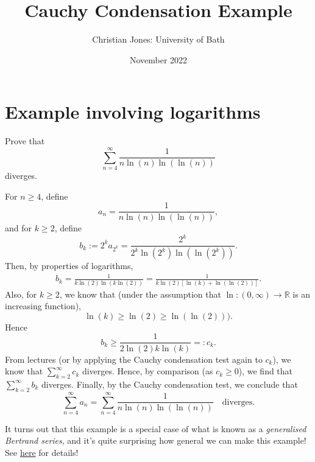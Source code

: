 \documentclass[
  10pt,
  a4paper]{article}
\title{Cauchy Condensation Example}
\author{Christian Jones: University of Bath}
\date{November 2022}
\theoremstyle{plain}
\theoremstyle{plain}
\theoremstyle{plain}
\theoremstyle{plain}
\theoremstyle{plain}
\theoremstyle{definition}
\theoremstyle{definition}
\theoremstyle{definition}
\theoremstyle{remark}
\let\BeginKnitrBlock\begin \let\EndKnitrBlock\end
\begin{document}
\maketitle

{
\setcounter{tocdepth}{2}
\tableofcontents
}
\newpage
{}

\hypertarget{example-involving-logarithms}{%
\section{Example involving logarithms}\label{example-involving-logarithms}}

\BeginKnitrBlock{example}
{\label{exm:ex1} }Prove that \[\sum_{n=4}^{\infty} \frac{1}{n\ln(n)\ln(\ln(n))}\] diverges.
\EndKnitrBlock{example}

\BeginKnitrBlock{solution*}
For \(n\geq4\), define \[a_n = \frac{1}{n\ln(n)\ln(\ln(n))},\] and for \(k\geq 2\), define \[b_k := 2^{k}a_{2^k} = \frac{2^k}{2^k\ln(2^k)\ln(\ln(2^k))}.\] Then, by properties of logarithms,
\begin{align*}
b_k = \frac{1}{k\ln(2)\ln(k\ln(2))} = \frac{1}{k\ln(2)[\ln(k) + \ln(\ln(2))]}.
\end{align*}
Also, for \(k\geq 2\), we know that (under the assumption that \(\ln : (0,\infty) \to \mathbb{R}\) is an increasing function), \[\ln(k) \geq \ln(2) \geq \ln(\ln(2))).\] Hence \[b_k \geq \frac{1}{2\ln(2)k\ln(k)} =: c_k.\] From lectures (or by applying the Cauchy condensation test again to \(c_k\)), we know that \(\sum_{k=2}^{\infty}c_k\) diverges. Hence, by comparison (as \(c_k \geq 0\)), we find that \(\sum_{k=2}^{\infty} b_k\) diverges. Finally, by the Cauchy condensation test, we conclude that \[\sum_{n=4}^{\infty} a_n = \sum_{n=4}^{\infty} \frac{1}{n\ln(n)\ln(\ln(n))} \quad \text{diverges.}\]
\EndKnitrBlock{solution*}

It turns out that this example is a special case of what is known as a \emph{generalised Bertrand series}, and it's quite surprising how general we can make this example! See \href{https://en.wikipedia.org/wiki/Cauchy_condensation_test\#Examples}{here} for details!
\end{document}
